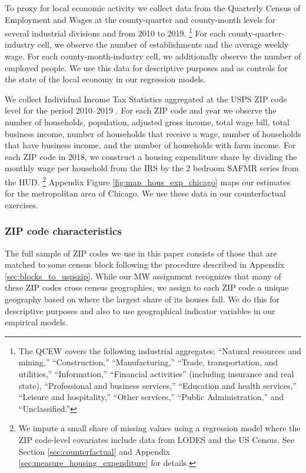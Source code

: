 To proxy for local economic activity we collect data from the 
Quarterly Census of Employment and Wages \parencite[QCEW;][]{QCEW} 
at the county-quarter and county-month levels for several industrial divisions 
and from 2010 to 2019.%
\footnote{The QCEW covers the following industrial aggregates: 
``Natural resources and mining,'' ``Construction,'' ``Manufacturing,'' 
``Trade, transportation, and utilities,'' ``Information,'' 
``Financial activities'' (including insurance and real state), 
``Professional and business services,'' ``Education and health services,'' 
``Leisure and hospitality,'' ``Other services,'' ``Public Administration,''
and ``Unclassified.''}
For each county-quarter-industry cell, we observe the number of establishments 
and the average weekly wage.
For each county-month-industry cell, we additionally observe the number of 
employed people.
We use this data for descriptive purposes and as controls for the state of 
the local economy in our regression models.

We collect Individual Income Tax Statistics aggregated at the USPS ZIP code 
level for the period 2010--2019 \parencite[][IRS for short]{IRS}.
For each ZIP code and year we observe the number of households, population, 
adjusted gross income, total wage bill, total business income, number of 
households that receive a wage, number of households that have business income, 
and the number of households with farm income.
For each ZIP code in 2018, we construct a housing expenditure share by dividing 
the monthly wage per household from the IRS by the 2 bedroom SAFMR series 
from the HUD.%
\footnote{We impute a small share of missing values using a regression model 
where the ZIP code-level covariates include data from LODES and the US Census.
See Section \ref{sec:counterfactual} and Appendix 
\ref{sec:measure_housing_expenditure} for details.}
Appendix Figure \ref{fig:map_hous_exp_chicago} maps our estimates for the 
metropolitan area of Chicago.
We use these data in our counterfactual exercises.

\subsubsection{ZIP code characteristics}
\label{sec:data_other_cross}

The full sample of ZIP codes we use in this paper consists of those that are 
matched to some census block following the procedure described in Appendix \ref{sec:blocks_to_uspszip}.
While our MW assignment recognizes that many of these ZIP codes cross census 
geographies, we assign to each ZIP code a unique geography based on where the 
largest share of its houses fall.
We do this for descriptive purposes and also to use geographical indicator 
variables in our empirical models.

